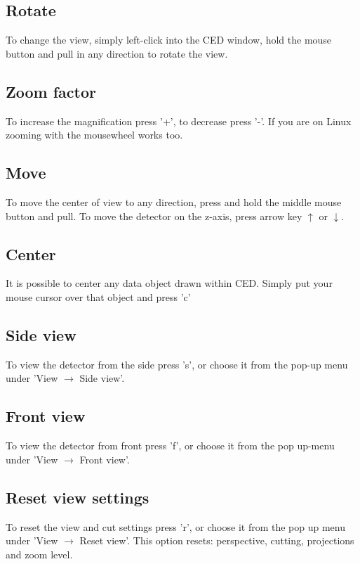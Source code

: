 \documentclass[a4paper,10pt]{article}
\begin{document}
\subsection{Rotate}
To change the view, simply left-click into the CED window, hold the mouse button and pull in any direction to rotate the view.
\subsection{Zoom factor}
To increase the magnification press '+', to decrease press '-'. If you are on Linux zooming with the mousewheel works too. 

\subsection{Move}
To move the center of view to any direction, press and hold the middle mouse button and pull. 
\newline\newline
To move the detector on the z-axis, press arrow key $\uparrow$ or $\downarrow$. 

\subsection{Center}
It is possible to center any data object drawn within CED. Simply put your mouse cursor over that object and press 'c' 

\subsection{Side view}
To view the detector from the side press 's', or choose it from the pop-up menu under 'View $\rightarrow$ Side view'.

\subsection{Front view}
To view the detector from front press 'f', or choose it from the pop up-menu under 'View $\rightarrow$ Front view'.

\subsection{Reset view settings}
To reset the view and cut settings press 'r', or choose it from the pop up menu under 'View $\rightarrow$ Reset view'. This option resets: perspective, cutting, projections and zoom level.
\end{document}
